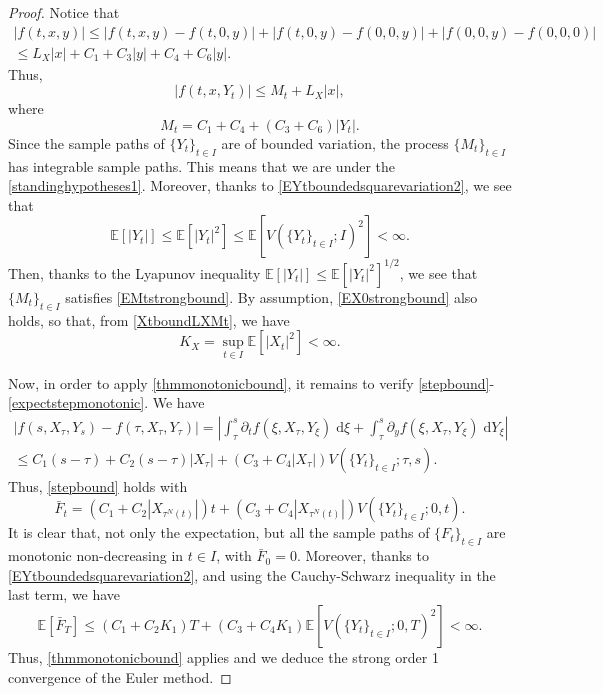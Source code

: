 \documentclass[reqno,12pt]{amsart}
\theoremstyle{plain}%
\theoremstyle{definition}
\begin{document}
\begin{proof}
    Notice that
    \begin{multline*}
        |f(t, x, y)| \leq |f(t, x, y) - f(t, 0, y)| + |f(t, 0, y) - f(0, 0, y)| + |f(0, 0, y) - f(0, 0, 0)| \\
        \leq L_X |x| + C_1 + C_3|y| + C_4 + C_6|y|. 
    \end{multline*}
    Thus,
    \[
        |f(t, x, Y_t)| \leq M_t + L_X |x|,
    \]
    where
    \[
        M_t = C_1 + C_4 + (C_3 + C_6)|Y_t|.
    \]
    Since the sample paths of $\{Y_t\}_{t\in I}$ are of bounded variation, the process $\{M_t\}_{t\in I}$ has integrable sample paths. This means that we are under the \cref{standinghypotheses1}. Moreover, thanks to \eqref{EYtboundedsquarevariation2}, we see that
    \[
        \mathbb{E}[|Y_t|] \leq \mathbb{E}[|Y_t|^2] \leq \mathbb{E}[V(\{Y_t\}_{t\in I}; I)^2] < \infty.
    \]
    Then, thanks to the Lyapunov inequality $\mathbb{E}[|Y_t|] \leq \mathbb{E}[|Y_t|^2]^{1/2}$, we see that $\{M_t\}_{t\in I}$ satisfies \eqref{EMtstrongbound}. By assumption, \eqref{EX0strongbound} also holds, so that, from \eqref{XtboundLXMt}, we have
    \[
        K_X = \sup_{t\in I}\mathbb{E}[|X_t|^2] < \infty.
    \]

    Now, in order to apply \cref{thmmonotonicbound}, it remains to verify \eqref{stepbound}-\eqref{expectstepmonotonic}. We have
    \begin{multline*}
        |f(s, X_\tau, Y_s) - f(\tau, X_\tau, Y_\tau)| = \left|\int_\tau^s \partial_t f(\xi, X_\tau, Y_\xi) \;\mathrm{d}\xi + \int_\tau^s \partial_y f(\xi, X_\tau, Y_\xi) \;\mathrm{d}Y_\xi\right| \\
        \leq C_1 (s-\tau) + C_2(s-\tau) |X_\tau| + (C_3 + C_4 |X_\tau|) V(\{Y_t\}_{t\in I}; \tau, s).
    \end{multline*}
    Thus, \eqref{stepbound} holds with
    \[
        \bar F_t = (C_1 + C_2 |X_{\tau^N(t)}|)t + (C_3 + C_4 |X_{\tau^N(t)}|) V(\{Y_t\}_{t\in I}; 0, t).
    \]
    It is clear that, not only the expectation, but all the sample paths of $\{F_t\}_{t\in I}$ are monotonic non-decreasing in $t\in I$, with $\bar F_0 = 0$. Moreover, thanks to \eqref{EYtboundedsquarevariation2}, and using the Cauchy-Schwarz inequality in the last term, we have
    \[
        \mathbb{E}[\bar F_T] \leq (C_1 + C_2 K_1)T + (C_3 + C_4K_1)\mathbb{E}[V(\{Y_t\}_{t\in I}; 0, T)^2] < \infty.
    \]
    Thus, \cref{thmmonotonicbound} applies and we deduce the strong order 1 convergence of the Euler method.
\end{proof}
\end{document}
